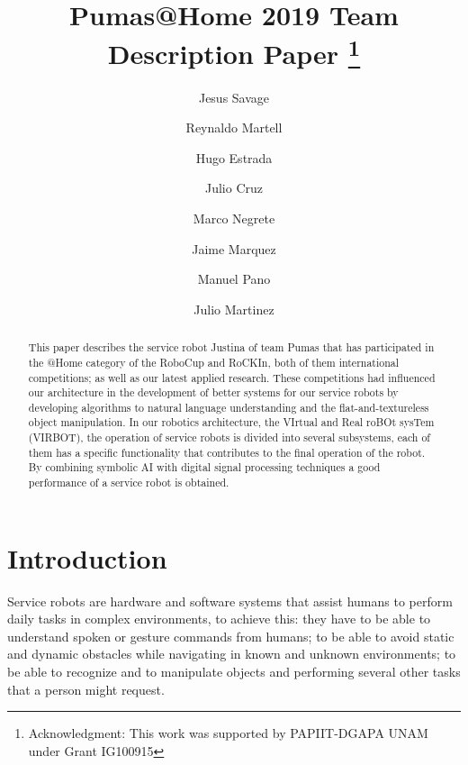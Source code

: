 \documentclass{llncs}
\begin{document}
\title{Pumas@Home 2019 Team Description Paper
\thanks{Acknowledgment: This work was supported by PAPIIT-DGAPA UNAM under Grant IG100915}}
\author{
	Jesus Savage 
	\and Reynaldo Martell 
	\and Hugo Estrada 
	\and Julio Cruz 
	\and Marco Negrete 
	\and Jaime Marquez
	\and Manuel Pano 
	\and Julio Martinez
}
\maketitle


\begin{abstract}

This paper describes the service robot Justina of team Pumas that has participated in the @Home category of the RoboCup and RoCKIn, both of them international competitions; as well as our latest applied research. These competitions had influenced our architecture in the development of better systems for our service robots by developing algorithms to natural language understanding and the flat-and-textureless object manipulation.
In our robotics architecture, the VIrtual and Real roBOt sysTem (VIRBOT), the operation of service robots is divided into several subsystems, each of them has a specific functionality  that contributes to the final operation of the robot.
By combining symbolic AI with digital signal processing techniques a good performance of a service robot is obtained.

\end{abstract}


\section{Introduction}

Service robots are hardware and software systems that assist humans to perform daily tasks in complex environments, to achieve this: they have to be able to understand spoken or gesture commands from humans; to be able to avoid static and dynamic obstacles while navigating in known and unknown environments; to be able to recognize and to manipulate objects and performing several other tasks that a person might request. 
\end{document}
